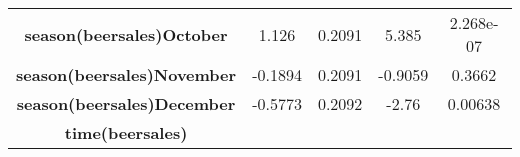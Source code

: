 \documentclass[]{book}
\theoremstyle{definition}
\theoremstyle{definition}
\theoremstyle{remark}
\begin{document}
\begin{longtable}[c]{@{}ccccc@{}}
\begin{minipage}[t]{0.37\columnwidth}
\textbf{season(beersales)October}
\strut\end{minipage} &
\begin{minipage}[t]{0.12\columnwidth}\centering\strut
1.126
\strut\end{minipage} &
\begin{minipage}[t]{0.14\columnwidth}\centering\strut
0.2091
\strut\end{minipage} &
\begin{minipage}[t]{0.11\columnwidth}\centering\strut
5.385
\strut\end{minipage} &
\begin{minipage}[t]{0.11\columnwidth}\centering\strut
2.268e-07
\strut\end{minipage}\tabularnewline
\begin{minipage}[t]{0.37\columnwidth}\centering\strut
\textbf{season(beersales)November}
\strut\end{minipage} &
\begin{minipage}[t]{0.12\columnwidth}\centering\strut
-0.1894
\strut\end{minipage} &
\begin{minipage}[t]{0.14\columnwidth}\centering\strut
0.2091
\strut\end{minipage} &
\begin{minipage}[t]{0.11\columnwidth}\centering\strut
-0.9059
\strut\end{minipage} &
\begin{minipage}[t]{0.11\columnwidth}\centering\strut
0.3662
\strut\end{minipage}\tabularnewline
\begin{minipage}[t]{0.37\columnwidth}\centering\strut
\textbf{season(beersales)December}
\strut\end{minipage} &
\begin{minipage}[t]{0.12\columnwidth}\centering\strut
-0.5773
\strut\end{minipage} &
\begin{minipage}[t]{0.14\columnwidth}\centering\strut
0.2092
\strut\end{minipage} &
\begin{minipage}[t]{0.11\columnwidth}\centering\strut
-2.76
\strut\end{minipage} &
\begin{minipage}[t]{0.11\columnwidth}\centering\strut
0.00638
\strut\end{minipage}\tabularnewline
\begin{minipage}[t]{0.37\columnwidth}\centering\strut
\textbf{time(beersales)}

\end{minipage}
\end{longtable}
\end{document}
